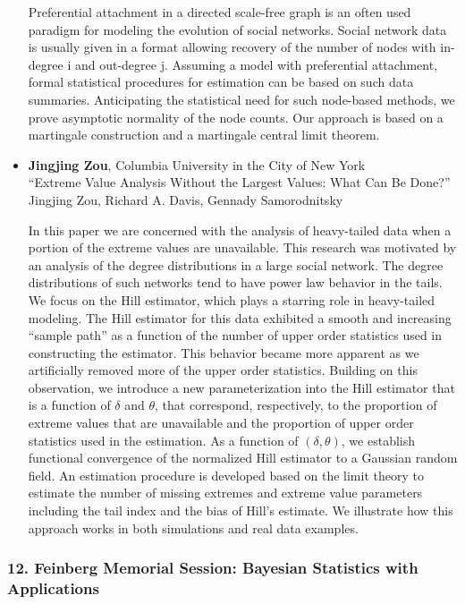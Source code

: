 \begin{itemize}
Preferential attachment in a directed scale-free graph is an often used paradigm for modeling the evolution of social networks. Social network data is usually given in a format allowing recovery of the number of nodes with in-degree i and out-degree j. Assuming a model with preferential attachment, formal statistical procedures for estimation can be based on such data summaries. Anticipating the statistical need for such node-based methods, we prove asymptotic normality of the node counts. Our approach is based on a martingale construction and a martingale central limit theorem.

\item \textbf{Jingjing Zou}, Columbia University in the City of New York \\
``Extreme Value Analysis Without the Largest Values: What Can Be Done?'' \\
Jingjing Zou, Richard A. Davis, Gennady Samorodnitsky


In this paper we are concerned with the analysis of heavy-tailed data when a portion of the extreme values are unavailable. 
This research was motivated by an analysis of the degree distributions in a large social network. The degree distributions of such networks tend to have power law behavior in the tails. 
We focus on the Hill estimator, which plays a starring role in heavy-tailed modeling. 
The Hill estimator for this data exhibited a smooth and increasing ``sample path'' as a function of the number of upper order statistics used in constructing the estimator.  
This behavior became more apparent as we artificially removed more of the upper order statistics. Building on this observation, we introduce a new parameterization into the Hill estimator that is a function of $\delta$ and $\theta$, that correspond, respectively, to the proportion of extreme values that are unavailable and the proportion of upper order statistics used in the estimation.
As a function of $(\delta, \theta)$, we establish functional convergence of the normalized Hill estimator to a Gaussian random field. An estimation procedure is developed based on the limit theory to estimate the number of missing extremes and extreme value parameters including the tail index and the bias of Hill's estimate. We illustrate how this approach works in both simulations and real data examples.

\end{itemize}

\subsubsection*{12. Feinberg Memorial Session: Bayesian Statistics with Applications}

